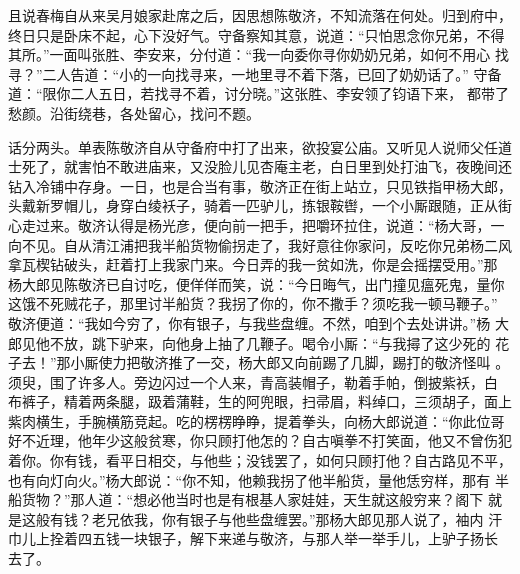 且说春梅自从来吴月娘家赴席之后，因思想陈敬济，不知流落在何处。归到府中，
终日只是卧床不起，心下没好气。守备察知其意，说道：“只怕思念你兄弟，不得
其所。”一面叫张胜、李安来，分付道：“我一向委你寻你奶奶兄弟，如何不用心
找寻？”二人告道：“小的一向找寻来，一地里寻不着下落，已回了奶奶话了。”
守备道：“限你二人五日，若找寻不着，讨分晓。”这张胜、李安领了钧语下来，
都带了愁颜。沿街绕巷，各处留心，找问不题。

话分两头。单表陈敬济自从守备府中打了出来，欲投宴公庙。又听见人说师父任道
士死了，就害怕不敢进庙来，又没脸儿见杏庵主老，白日里到处打油飞，夜晚间还
钻入冷铺中存身。一日，也是合当有事，敬济正在街上站立，只见铁指甲杨大郎，
头戴新罗帽儿，身穿白绫袄子，骑着一匹驴儿，拣银鞍辔，一个小厮跟随，正从街
心走过来。敬济认得是杨光彦，便向前一把手，把嚼环拉住，说道：“杨大哥，一
向不见。自从清江浦把我半船货物偷拐走了，我好意往你家问，反吃你兄弟杨二风
拿瓦楔钻破头，赶着打上我家门来。今日弄的我一贫如洗，你是会摇摆受用。”那
杨大郎见陈敬济已自讨吃，便佯佯而笑，说：“今日晦气，出门撞见瘟死鬼，量你
这饿不死贼花子，那里讨半船货？我拐了你的，你不撒手？须吃我一顿马鞭子。”
敬济便道：“我如今穷了，你有银子，与我些盘缠。不然，咱到个去处讲讲。”杨
大郎见他不放，跳下驴来，向他身上抽了几鞭子。喝令小厮：“与我撏了这少死的
花子去！”那小厮使力把敬济推了一交，杨大郎又向前踢了几脚，踢打的敬济怪叫
。须臾，围了许多人。旁边闪过一个人来，青高装帽子，勒着手帕，倒披紫袄，白
布裤子，精着两条腿，趿着蒲鞋，生的阿兜眼，扫帚眉，料绰口，三须胡子，面上
紫肉横生，手腕横筋竞起。吃的楞楞睁睁，提着拳头，向杨大郎说道：“你此位哥
好不近理，他年少这般贫寒，你只顾打他怎的？自古嗔拳不打笑面，他又不曾伤犯
着你。你有钱，看平日相交，与他些；没钱罢了，如何只顾打他？自古路见不平，
也有向灯向火。”杨大郎说：“你不知，他赖我拐了他半船货，量他恁穷样，那有
半船货物？”那人道：“想必他当时也是有根基人家娃娃，天生就这般穷来？阁下
就是这般有钱？老兄依我，你有银子与他些盘缠罢。”那杨大郎见那人说了，袖内
汗巾儿上拴着四五钱一块银子，解下来递与敬济，与那人举一举手儿，上驴子扬长
去了。

